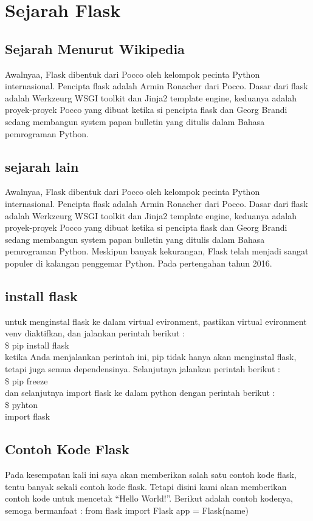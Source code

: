 \documentclass[12pt,a4paper]{article}
\begin{document}
\section{Sejarah Flask}
\subsection{Sejarah Menurut Wikipedia}
Awalnyaa, Flask dibentuk dari Pocco oleh kelompok pecinta Python internasional. Pencipta flask adalah Armin Ronacher dari Pocco. Dasar dari flask adalah Werkzeurg WSGI toolkit dan Jinja2 template engine, keduanya adalah proyek-proyek Pocco yang dibuat ketika si pencipta flask dan Georg Brandi sedang membangun system papan bulletin yang ditulis dalam Bahasa pemrograman Python.

\subsection{sejarah lain}
Awalnyaa, Flask dibentuk dari Pocco oleh kelompok pecinta Python internasional. Pencipta flask adalah Armin Ronacher dari Pocco. Dasar dari flask adalah Werkzeurg WSGI toolkit dan Jinja2 template engine, keduanya adalah proyek-proyek Pocco yang dibuat ketika si pencipta flask dan Georg Brandi sedang membangun system papan bulletin yang ditulis dalam Bahasa pemrograman Python. Meskipun banyak kekurangan, Flask telah menjadi sangat populer di kalangan penggemar Python. Pada pertengahan tahun 2016. 
\subsection{install flask}
untuk menginstal flask ke dalam virtual evironment, pastikan virtual evironment venv diaktifkan, dan jalankan perintah berikut :\\
\$ pip install flask\\
ketika Anda menjalankan perintah ini, pip tidak hanya akan menginstal flask, tetapi juga semua dependensinya. Selanjutnya jalankan perintah berikut :\\
\$ pip freeze\\
dan selanjutnya import flask ke dalam python dengan perintah berikut :\\
\$ pyhton\\
import flask
\subsection{Contoh Kode Flask}
Pada kesempatan kali ini saya akan memberikan salah satu contoh kode flask, tentu banyak sekali contoh kode flask. Tetapi disini kami akan memberikan contoh kode untuk mencetak “Hello World!”. Berikut adalah contoh kodenya, semoga bermanfaat :
from flask import Flask
app = Flask(name)
\end{document}
